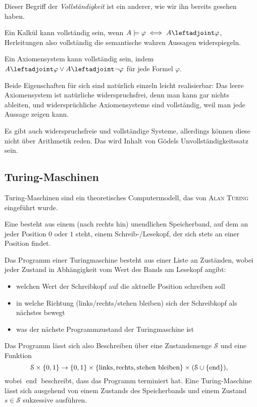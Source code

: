 \documentclass[ngerman]{scrartcl}
\def\shows{\leftadjoint}
\begin{document}
\begin{remark}
  Dieser Begriff der \emph{Vollständigkeit} ist ein anderer, wie wir ihn bereits gesehen haben.

  Ein Kalkül kann vollständig sein, wenn $A \models \varphi \iff  A \shows \varphi $,
  Herleitungen also vollständig die semantische wahren Aussagen widerspiegeln.

  Ein Axiomensystem kann vollständig sein, indem $A \shows \varphi \lor A \shows \lnot \varphi $ für jede Formel $\varphi $.
\end{remark}

\begin{remark}
  Beide Eigenschaften für sich sind natürlich einzeln leicht realisierbar:
  Das leere Axiomensystem ist natürliche widerspruchsfrei, denn man kann gar nichts ableiten, und widersprüchliche Axiomensysteme sind vollständig, weil man jede Aussage zeigen kann.

  Es gibt auch widerspruchsfreie und vollständige Systeme,
  allerdings können diese nicht über Arithmetik reden.
  Das wird Inhalt von Gödels Unvollständigkeitssatz sein.
\end{remark}


\subsection{Turing-Maschinen}
Turing-Maschinen sind ein theoretisches Computermodell,
das von \textsc{Alan Turing} eingeführt wurde.

\begin{definition}
  Eine  besteht aus einem (nach rechts hin)
  unendlichen Speicherband, auf dem an jeder Position $0$ oder $1$ steht,
  einem Schreib-/Lesekopf, der sich stets an einer Position findet.

  Das Programm einer Turingmaschine besteht aus einer Liste an Zuständen,
  wobei jeder Zustand in Abhängigkeit vom Wert des Bands am Lesekopf angibt:
  \begin{itemize}
    \item welchen Wert der Schreibkopf auf die aktuelle Position schreiben soll
    \item in welche Richtung (links/rechts/stehen bleiben) sich der Schreibkopf als nächstes bewegt
    \item was der nächste Programmzustand der Turingmaschine ist
  \end{itemize}

  Das Programm lässt sich also Beschreiben über eine Zustandsmenge $\mathcal{S}$
  und eine Funktion
  \[
    \mathcal{S} \times \set{ 0,1 } \to  \set{ 0,1 } \times \set{ \text{links}, \text{rechts}, \text{stehen bleiben} } \times (\mathcal{S} \cup \set{ \operatorname{end} } )
    ,
  \]
  wobei $\operatorname{end}$ beschreibt, dass das Programm terminiert hat.
  Eine Turing-Maschine lässt sich ausgehend von einem Zustands des Speicherbands und einem Zustand $s \in \mathcal{S}$ sukzessive ausführen.
\end{definition}
\end{document}
